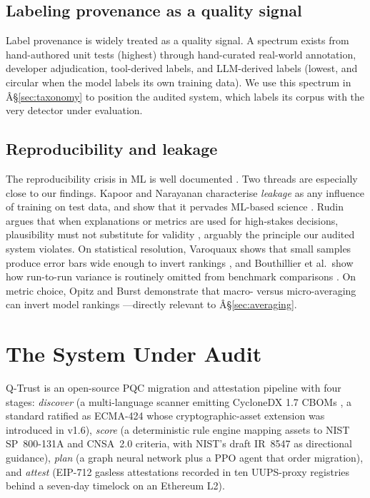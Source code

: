 \documentclass[conference]{IEEEtran}
\begin{document}
\subsection{Labeling provenance as a quality signal}

\label{sec:related-use}
Label provenance is widely treated as a quality signal. A spectrum exists from
hand-authored unit tests (highest) through hand-curated real-world annotation, developer
adjudication, tool-derived labels, and LLM-derived labels (lowest, and circular when the
model labels its own training data). We use this spectrum in Â§\ref{sec:taxonomy} to
position the audited system, which labels its corpus with the very detector under
evaluation.

\subsection{Reproducibility and leakage}

The reproducibility crisis in ML is well documented \cite{pineau2019}. Two threads are
especially close to our findings. Kapoor and Narayanan characterise \emph{leakage} as any
influence of training on test data, and show that it pervades ML-based science
\cite{kapoor2023}. Rudin argues that when explanations or metrics are used for
high-stakes decisions, plausibility must not substitute for validity \cite{rudin2019},
arguably the principle our audited system violates. On statistical resolution, Varoquaux
shows that small samples produce error bars wide enough to invert rankings
\cite{varoquaux2018}, and Bouthillier et al.\ show how run-to-run variance is routinely
omitted from benchmark comparisons \cite{bouthillier2021}. On metric choice, Opitz and
Burst demonstrate that macro- versus micro-averaging can invert model rankings
\cite{opitz2021}---directly relevant to Â§\ref{sec:averaging}.

\section{The System Under Audit}

\label{sec:system}

Q-Trust is an open-source PQC migration and attestation pipeline with four stages:
\emph{discover} (a multi-language scanner emitting CycloneDX 1.7 CBOMs \cite{cyclonedx},
a standard ratified as ECMA-424 whose cryptographic-asset extension was introduced in
v1.6), \emph{score} (a deterministic rule engine mapping assets to NIST SP~800-131A
\cite{sp800131a} and CNSA~2.0 \cite{cnsa20} criteria, with NIST's draft IR~8547
\cite{ir8547} as directional guidance), \emph{plan} (a graph neural network plus a PPO
agent that order migration), and \emph{attest} (EIP-712 \cite{eip712} gasless attestations
recorded in ten UUPS-proxy registries behind a seven-day timelock on an Ethereum L2).
\end{document}
